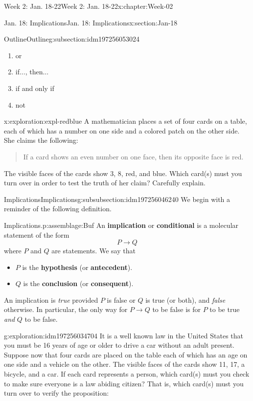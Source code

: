 \documentclass[oneside,10pt,]{book}
\newcommand{\terminology}[1]{\textbf{#1}}
\numberwithin{equation}{section}
\begin{document}
\begin{chapterptx}{Week 2: Jan. 18-22}{}{Week 2: Jan. 18-22}{}{}{x:chapter:Week-02}
\begin{sectionptx}{Jan. 18: Implications}{}{Jan. 18: Implications}{}{}{x:section:Jan-18}
\begin{subsectionptx}{Outline}{}{Outline}{}{}{g:subsection:idm197256053024}
\begin{enumerate}
\item{}or%
\item{}if..., then...%
\item{}if and only if%
\item{}not%
\end{enumerate}
\begin{exploration}{}{x:exploration:expl-redblue}%
A mathematician places a set of four cards on a table, each of which has a number on one side and a colored patch on the other side. She claims the following: \begin{quote}%
If a card shows an even number on one face, then its opposite face is red.\end{quote}
 The visible faces of the cards show 3, 8, red, and blue. Which card(s) must you turn over in order to test the truth of her claim? Carefully explain.%
\end{exploration}%
%
%
\typeout{************************************************}
\typeout{************************************************}
%
\begin{subsubsectionptx}{Implications}{}{Implications}{}{}{g:subsubsection:idm197256046240}
We begin with a reminder of the following definition.%
\begin{assemblage}{Implications.}{p:assemblage:Buf}%
An \terminology{implication} or \terminology{conditional} is a molecular statement of the form%
\begin{equation*}
P \to Q
\end{equation*}
where \(P\) and \(Q\) are statements. We say that%
\begin{itemize}[label=\textbullet]
\item{}\(P\) is the \terminology{hypothesis} (or \terminology{antecedent}).%
\item{}\(Q\) is the \terminology{conclusion} (or \terminology{consequent}).%
\end{itemize}
%
\par
An implication is \emph{true} provided \(P\) is false or \(Q\) is true (or both), and \emph{false} otherwise. In particular, the only way for \(P \to Q\) to be false is for \(P\) to be true \emph{and} \(Q\) to be false.%
\end{assemblage}
\begin{exploration}{}{g:exploration:idm197256034704}%
It is a well known law in the United States that you must be 16 years of age or older to drive a car without an adult present. Suppose now that four cards are placed on the table each of which has an age on one side and a vehicle on the other. The visible faces of the cards show 11, 17, a bicycle, and a car. If each card represents a person, which card(s) must you check to make sure everyone is a law abiding citizen? That is, which card(s) must you turn over to verify the proposition:%

\end{exploration}
\end{subsubsectionptx}
\end{subsectionptx}
\end{sectionptx}
\end{chapterptx}
\end{document}
